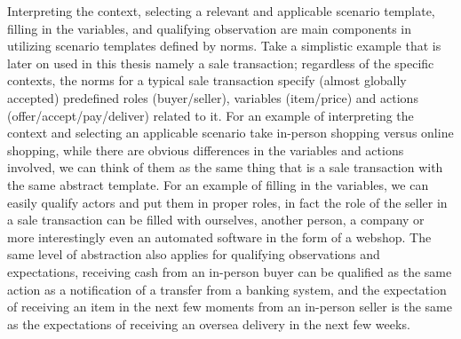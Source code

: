 Interpreting the context, selecting a relevant and applicable scenario template, filling in the variables, and qualifying observation are main components in utilizing scenario templates defined by norms. 
Take a simplistic example 
that is later on used in this thesis namely a sale transaction; regardless of the specific contexts, the norms for a typical sale transaction specify (almost globally accepted) predefined roles (buyer/seller), variables (item/price) and actions (offer/accept/pay/deliver) related to it. For an example of interpreting the context and selecting an applicable scenario take in-person shopping versus online shopping, while there are obvious differences in the variables and actions involved, we can think of them as the same thing that is a sale transaction with the same abstract template. For an example of filling in the variables, we can easily qualify actors and put them in proper roles, in fact the role of the seller in a sale transaction can be filled with ourselves, another person, a company or more interestingly even an automated software in the form of a webshop. The same level of abstraction also applies for qualifying observations and expectations, receiving cash from an in-person buyer can be qualified as the same action as a notification of a transfer from a banking system, and the expectation of receiving an item in the next few moments from an in-person seller is the same as the expectations of receiving an oversea delivery in the next few weeks.

